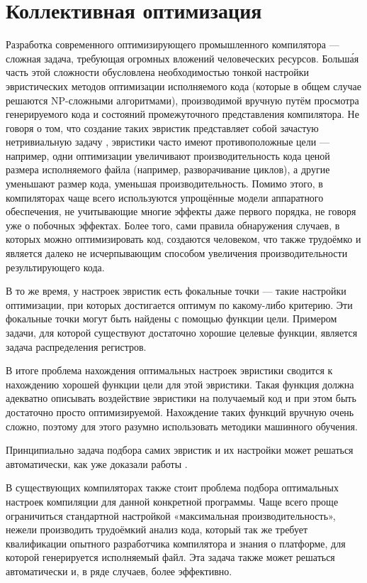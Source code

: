 \section{Коллективная оптимизация}
Разработка современного оптимизирующего промышленного компилятора --- сложная задача, требующая огромных вложений человеческих ресурсов. Больш\'{а}я часть этой сложности обусловлена необходимостью тонкой настройки эвристических методов оптимизации исполняемого кода (которые в общем случае решаются NP-сложными алгоритмами), производимой вручную путём просмотра генерируемого кода и состояний промежуточного представления компилятора. Не говоря о том, что создание таких эвристик представляет собой зачастую нетривиальную задачу \cite{Lavery:1995:IPC:626512.626987,Abraham:1996:MSR:243846.243903}, эвристики часто имеют противоположные цели --- например, одни оптимизации увеличивают производительность кода ценой размера исполняемого файла (например, разворачивание циклов), а другие уменьшают размер кода, уменьшая производительность. Помимо этого, в компиляторах чаще всего используются упрощённые модели аппаратного обеспечения, не учитывающие многие эффекты даже первого порядка, не говоря уже о побочных эффектах. Более того, сами правила обнаружения случаев, в которых можно оптимизировать код, создаются человеком, что также трудоёмко и является далеко не исчерпывающим способом увеличения производительности результирующего кода.

В то же время, у настроек эвристик есть фокальные точки --- такие настройки оптимизации, при которых достигается оптимум по какому-либо критерию. Эти фокальные точки могут быть найдены с помощью функции цели. Примером задачи, для которой существуют достаточно хорошие целевые функции, является задача распределения регистров.

В итоге проблема нахождения оптимальных настроек эвристики сводится к нахождению хорошей функции цели для этой эвристики. Такая функция должна адекватно описывать воздействие эвристики на получаемый код и при этом быть достаточно просто оптимизируемой. Нахождение таких функций вручную очень сложно, поэтому для этого разумно использовать методики машинного обучения.

 Принципиально задача подбора самих эвристик и их настройки может решаться автоматически, как уже доказали работы \cite{Agakov:2006:UML:1121992.1122412,Bodin98iterativecompilation,FCA2007,Cooper:2005:AAC:1065910.1065921}. 

В существующих компиляторах также стоит проблема подбора оптимальных настроек компиляции для данной конкретной программы. Чаще всего проще ограничиться стандартной настройкой «максимальная производительность», нежели производить трудоёмкий анализ кода, который так же требует квалификации опытного разработчика компилятора и знания о платформе, для которой генерируется исполняемый файл. Эта задача также может решаться автоматически и, в ряде случаев, более эффективно.

